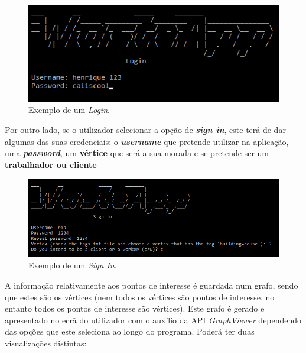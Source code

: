 \documentclass[article, a4paper, 12pt, oneside]{memoir}
\begin{document}
\begin{figure}[h!]
  \centerline{\includegraphics[scale=0.7]{wasteapp_login.png}}
  \caption{Exemplo de um \textit{Login}.}
\end{figure}

Por outro lado, se o utilizador selecionar a opção de \textit{\textbf{sign in}}, este terá de dar algumas das suas credenciais: o \textbf{\textit{username}} que pretende utilizar na aplicação, uma \textbf{\textit{password}}, um \textbf{vértice} que será a sua morada e se pretende ser um \textbf{trabalhador ou cliente}

\begin{figure}[h!]
  \centerline{\includegraphics[scale=0.7]{wasteapp_signin.png}}
  \caption{Exemplo de um \textit{Sign In}.}
\end{figure}

A informação relativamente aos pontos de interesse é guardada num grafo, sendo que estes são os vértices (nem todos os vértices são pontos de interesse, no entanto todos os pontos de interesse são vértices). Este grafo é gerado e apresentado no ecrã do utilizador com o auxílio da API \textit{GraphViewer} dependendo das opções que este seleciona ao longo do programa. Poderá ter duas visualizações distintas:
\end{document}
